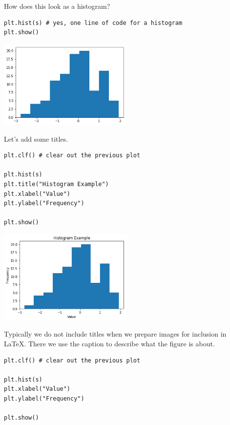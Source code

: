 How does this look as a histogram?

\begin{verbatim}
plt.hist(s) # yes, one line of code for a histogram
plt.show()
\end{verbatim}

\begin{center}
\includegraphics[width=0.5\textwidth]{scipy/output_23_0.png}
\end{center}

Let's add some titles.

\begin{verbatim}
plt.clf() # clear out the previous plot

plt.hist(s)
plt.title("Histogram Example")
plt.xlabel("Value")
plt.ylabel("Frequency")

plt.show()
\end{verbatim}

\begin{center}
\includegraphics[width=0.5\textwidth]{scipy/output_25_0.png}
\end{center}

Typically we do not include titles when we prepare images for inclusion
in LaTeX. There we use the caption to describe what the figure is about.

\begin{verbatim}
plt.clf() # clear out the previous plot

plt.hist(s)
plt.xlabel("Value")
plt.ylabel("Frequency")

plt.show()
\end{verbatim}

